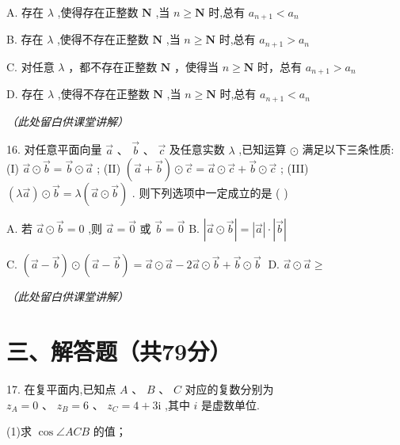 \documentclass[10pt]{article}
\newcommand{\hardboardspace}{%
  \par\vspace{5cm}
  \hfill\textit{（此处留白供课堂讲解）}
  \par\vspace{1cm}
}
\begin{document}
A. 存在 \(\lambda\) ,使得存在正整数 \(\mathbf{N}\) ,当 \(n \geq  \mathbf{N}\) 时,总有 \({a}_{n + 1} < {a}_{n}\)

B. 存在 \(\lambda\) ,使得不存在正整数 \(\mathbf{N}\) ,当 \(n \geq  \mathbf{N}\) 时,总有 \({a}_{n + 1} > {a}_{n}\)

C. 对任意 \(\lambda\) ，都不存在正整数 \(\mathbf{N}\) ，使得当 \(n \geq  \mathbf{N}\) 时，总有 \({a}_{n + 1} > {a}_{n}\)

D. 存在 \(\lambda\) ,使得不存在正整数 \(\mathbf{N}\) ,当 \(n \geq  \mathbf{N}\) 时,总有 \({a}_{n + 1} < {a}_{n}\)

\hardboardspace

16. 对任意平面向量 \(\overrightarrow{a}\text{ 、 }\overrightarrow{b}\text{ 、 }\overrightarrow{c}\) 及任意实数 \(\lambda\) ,已知运算 \(\odot\) 满足以下三条性质: (I) \(\overrightarrow{a} \odot  \overrightarrow{b} = \overrightarrow{b} \odot  \overrightarrow{a}\) ; (II) \(\left( {\overrightarrow{a} + \overrightarrow{b}}\right)  \odot  \overrightarrow{c} = \overrightarrow{a} \odot  \overrightarrow{c} + \overrightarrow{b} \odot  \overrightarrow{c}\) ; (III) \(\left( {\lambda \overrightarrow{a}}\right)  \odot  \overrightarrow{b} = \lambda \left( {\overrightarrow{a} \odot  \overrightarrow{b}}\right)\) . 则下列选项中一定成立的是 ( )

A. 若 \(\overrightarrow{a} \odot  \overrightarrow{b} = 0\) ,则 \(\overrightarrow{a} = \overrightarrow{0}\) 或 \(\overrightarrow{b} = \overrightarrow{0}\) B. \(\left| {\overrightarrow{a} \odot  \overrightarrow{b}}\right|  = \left| \overrightarrow{a}\right|  \cdot  \left| \overrightarrow{b}\right|\)

C. \(\left( {\overrightarrow{a} - \overrightarrow{b}}\right)  \odot  \left( {\overrightarrow{a} - \overrightarrow{b}}\right)  = \overrightarrow{a} \odot  \overrightarrow{a} - 2\overrightarrow{a} \odot  \overrightarrow{b} + \overrightarrow{b} \odot  \overrightarrow{b}\;\) D. \(\overrightarrow{a} \odot  \overrightarrow{a} \geq\)

\hardboardspace

\section*{三、解答题（共79分）}

17. 在复平面内,已知点 \(A\text{ 、 }B\text{ 、 }C\) 对应的复数分别为 \({z}_{A} = 0\text{ 、 }{z}_{B} = 6\text{ 、 }{z}_{C} = 4 + 3\mathrm{i}\) ,其中 \(i\) 是虚数单位.

(1)求 \(\cos \angle {ACB}\) 的值；
\end{document}
